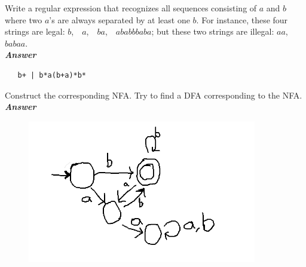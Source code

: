 \documentclass[a4paper]{article}
\begin{document}
\begin{exercise}\label{exer-re}
  
  Write a regular expression that recognizes all sequences consisting
  of $a$ and $b$ where two $a$'s are always separated by at least one
  $b$.  For instance, these four strings are legal: $b$,\ \ $a$,\ \ 
  $ba$,\ \ $ababbbaba$; but these two strings are illegal: $aa$,\ \ 
  $babaa$.  \\

\noindent
\textbf{\emph{Answer}} 
{\codesetup\begin{verbatim}
   b+ | b*a(b+a)*b*
\end{verbatim}} 

 \noindent 
  Construct the corresponding NFA\@.  Try to find a DFA corresponding
  to the NFA. \\

\noindent
\textbf{\emph{Answer}} 
\begin{figure}[H]
  \includegraphics[width=10cm]{nfa.png}
\end{figure}
\end{exercise}
\end{document}
